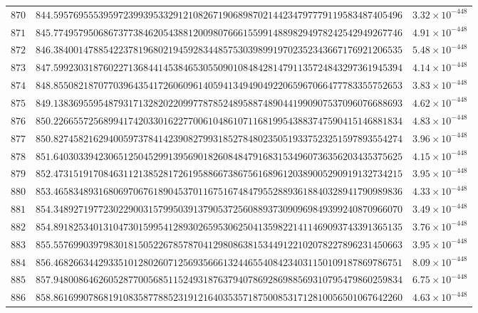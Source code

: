 \documentclass[12pt,reqno]{amsart}
\theoremstyle{remark}
\begin{document}
\begin{longtable}{clc}
$870$ & $844.5957695553959723993953329121082671906898702144234797779119583487405496$ & $3.32\times 10^{-448}$ \\
$871$ & $845.7749579506867377384620543881200980766615599148898294978242542949267746$ & $4.91\times 10^{-448}$ \\
$872$ & $846.3840014788542237819680219459283448575303989919702352343667176921206535$ & $5.48\times 10^{-448}$ \\
$873$ & $847.5992303187602271368441453846530550901084842814791135724843297361945394$ & $4.14\times 10^{-448}$ \\
$874$ & $848.8550821870770396435417260609614059413494904922065967066477783355752653$ & $3.83\times 10^{-448}$ \\
$875$ & $849.1383695595487931713282022099778785248958874890441990907537096076688693$ & $4.62\times 10^{-448}$ \\
$876$ & $850.2266557256899417420330162277006104861071168199543883747590415146881834$ & $4.83\times 10^{-448}$ \\
$877$ & $850.8274582162940059737841423908279931852784802350519337523251597893554274$ & $3.96\times 10^{-448}$ \\
$878$ & $851.6403033942306512504529913956901826084847916831534960736356203435375625$ & $4.15\times 10^{-448}$ \\
$879$ & $852.4731519170846311213852817261958866738675616896120389005290919132734215$ & $3.95\times 10^{-448}$ \\
$880$ & $853.4658348931680697067618904537011675167484795528893618840328941790989836$ & $4.33\times 10^{-448}$ \\
$881$ & $854.3489271977230229003157995039137905372560889373090969849399240870966070$ & $3.49\times 10^{-448}$ \\
$882$ & $854.8918253401310473015995412893026595306250413598221411469093743391365135$ & $3.76\times 10^{-448}$ \\
$883$ & $855.5576990397983018150522678578704129808638153449122102078227896231450663$ & $3.95\times 10^{-448}$ \\
$884$ & $856.4682663442933510128026071256935666132446554084234031150109187869786751$ & $8.09\times 10^{-448}$ \\
$885$ & $857.9480086462605287700568511524931876379407869286988569310795479860259834$ & $6.75\times 10^{-448}$ \\
$886$ & $858.8616990786819108358778852319121640353571875008531712810056501067642260$ & $4.63\times 10^{-448}$ \\

\end{longtable}
\end{document}
